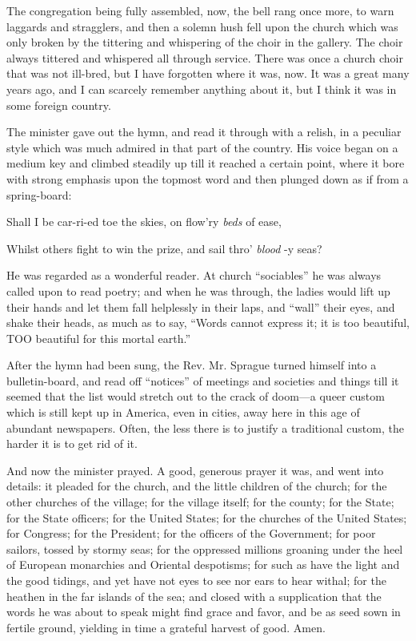 \documentclass{book}
\begin{document}
The congregation being fully assembled, now, the bell rang once more, to warn laggards and stragglers, and then a solemn hush fell upon the church which was only broken by the tittering and whispering of the choir in the gallery. The choir always tittered and whispered all through service. There was once a church choir that was not ill-bred, but I have forgotten where it was, now. It was a great many years ago, and I can scarcely remember anything about it, but I think it was in some foreign country.

The minister gave out the hymn, and read it through with a relish, in a peculiar style which was much admired in that part of the country. His voice began on a medium key and climbed steadily up till it reached a certain point, where it bore with strong emphasis upon the topmost word and then plunged down as if from a spring-board:

Shall I be car-ri-ed toe the skies, on flow’ry \emph{beds} of ease,

Whilst others fight to win the prize, and sail thro’ \emph{blood} -y seas?

He was regarded as a wonderful reader. At church “sociables” he was always called upon to read poetry; and when he was through, the ladies would lift up their hands and let them fall helplessly in their laps, and “wall” their eyes, and shake their heads, as much as to say, “Words cannot express it; it is too beautiful, TOO beautiful for this mortal earth.”

After the hymn had been sung, the Rev. Mr. Sprague turned himself into a bulletin-board, and read off “notices” of meetings and societies and things till it seemed that the list would stretch out to the crack of doom—a queer custom which is still kept up in America, even in cities, away here in this age of abundant newspapers. Often, the less there is to justify a traditional custom, the harder it is to get rid of it.

And now the minister prayed. A good, generous prayer it was, and went into details: it pleaded for the church, and the little children of the church; for the other churches of the village; for the village itself; for the county; for the State; for the State officers; for the United States; for the churches of the United States; for Congress; for the President; for the officers of the Government; for poor sailors, tossed by stormy seas; for the oppressed millions groaning under the heel of European monarchies and Oriental despotisms; for such as have the light and the good tidings, and yet have not eyes to see nor ears to hear withal; for the heathen in the far islands of the sea; and closed with a supplication that the words he was about to speak might find grace and favor, and be as seed sown in fertile ground, yielding in time a grateful harvest of good. Amen.
\end{document}
